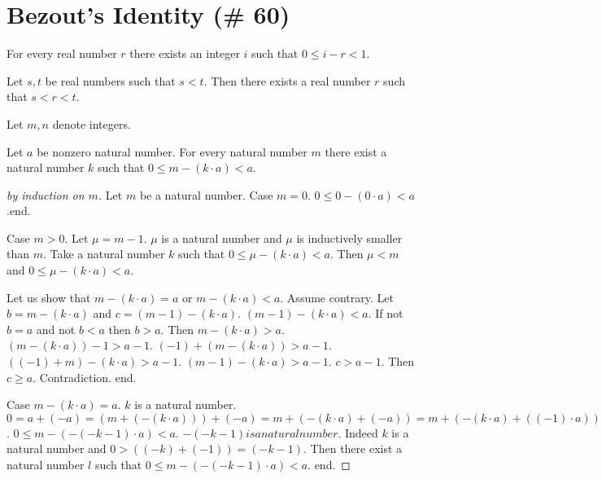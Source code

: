 \documentclass{article}
\begin{document}
\section{Bezout's Identity (\# 60)}

\begin{forthel}
\begin{axiom}%
For every real number $r$ there exists an integer $i$ such that $0 \leq i-r < 1$.
\end{axiom}

\begin{axiom}
Let $s,t$ be real numbers such that $s < t$.
Then there exists a real number $r$ such that $s < r < t$.
\end{axiom}




Let $m,n$ denote integers.


\begin{proposition}
Let $a$ be nonzero natural number.
For every natural number $m$ there exist
a natural number $k$ such that $0 \leq m - (k \cdot a) < a$.
\end{proposition}
\begin{proof}[by induction on $m$]
Let $m$ be a natural number.
Case $m = 0$.
$0 \leq 0 - (0 \cdot a) < a$.end.

Case $m > 0$. Let $\mu = m-1$.
$\mu$ is a natural number and $\mu$ is inductively smaller than $m$.
Take a natural number $k$ such that $0 \leq \mu - (k \cdot a) < a$.
Then $\mu < m$ and $0 \leq \mu - (k \cdot a) <  a$.

Let us show that $m - (k \cdot a) = a$ or $m - (k \cdot a) < a$.
Assume contrary.
Let $b = m - (k \cdot a)$ and $c = (m-1) - (k \cdot a)$.
$(m-1) - (k \cdot a) < a$.
If not $b = a$ and not $b < a$ then $b > a$.
Then $m - (k \cdot a) > a$.
$(m - (k \cdot a)) - 1 > a - 1$.
$(-1) + (m - (k\cdot a)) > a - 1$.
$((-1) + m) - (k \cdot a) > a - 1$.
$(m-1) - (k \cdot a) > a - 1$.
$c > a-1$.
Then $c \geq a$.
Contradiction.
end.

Case $m - (k \cdot a) = a$. 
$k$ is a natural number.
$0 = 
a + (-a) = 
(m + (-(k \cdot a))) + (-a) =
m + (-(k \cdot a) + (-a)) = 
m + (-(k \cdot a) + ((-1) \cdot a)) = 
m + (((-k) \cdot a) + ((-1) \cdot a)) =
m + (((-k)+(-1)) \cdot a) = 
m + ((-k-1) \cdot a) =
m - (-(-k-1) \cdot a)$. 
$0 \leq m - (-(-k-1) \cdot a) < a$. 
$-(-k-1) is a natural number$. 
Indeed $k$ is a natural number and $0 > ((-k) + (-1)) = (-k-1)$.
Then there exist a natural number $l$ such that
$0 \leq m - (-(-k-1) \cdot a) < a$.
end.


\end{proof}
\end{forthel}
\end{document}

